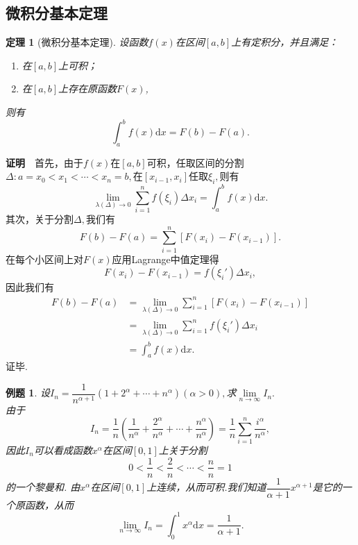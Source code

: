 \documentclass[UTF8]{article}
\newcommand{\dx}{\mathrm{d}x}
\newcommand{\zm}{\textbf{证明}$\quad$}
\newtheorem{thm}{\hspace{2em}定理}[section]
\newtheorem{exa}{\hspace{2em}例题}[section]
\begin{document}
  \subsection{微积分基本定理}
    \begin{thm}[微积分基本定理]
      设函数$f(x)$在区间$[a,b]$上有定积分，并且满足：
      \begin{enumerate}
        \item 在$[a,b]$上可积；
        \item 在$[a,b]$上存在原函数$F(x)$,
      \end{enumerate}
      则有$$\int_a^bf(x)\dx=F(b)-F(a).$$
      \end{thm}
      \zm 首先，由于$f(x)$在$[a,b]$可积，任取区间的分割$\Delta:a=x_0<x_1<\cdots<x_n=b,$在$[x_{i-1},x_i]$任取$\xi_i,$则有
      $$\lim_{\lambda(\Delta)\to0}\sum_{i=1}^nf(\xi_i)\Delta x_i=\int_a^bf(x)\dx.$$
      其次，关于分割$\Delta,$我们有
      $$F(b)-F(a)=\sum_{i=1}^n[F(x_i)-F(x_{i-1})].$$
      在每个小区间上对$F(x)$应用Lagrange中值定理得
      $$F(x_i)-F(x_{i-1})=f(\xi_i')\Delta x_i,$$
      因此我们有
      \begin{align*}
        F(b)-F(a)&=\lim_{\lambda(\Delta)\to0}\sum_{i=1}^n[F(x_i)-F(x_{i-1})]\\
        &=\lim_{\lambda(\Delta)\to0}\sum_{i=1}^nf(\xi_i')\Delta x_i\\
        &=\int_a^bf(x)\dx.
      \end{align*}
      证毕.
    \begin{exa}
      设$I_n=\dfrac{1}{n^{\alpha+1}}(1+2^\alpha+\cdots+n^\alpha)(\alpha>0),$求$\lim\limits_{n\to\infty}I_n.$\\
      由于
      $$I_n=\frac{1}{n}\left(\frac{1}{n^\alpha}+\frac{2^\alpha}{n^\alpha}+\cdots+\frac{n^\alpha}{n^\alpha}\right)
      =\frac{1}{n}\sum_{i=1}^n\frac{i^\alpha}{n^\alpha},$$
      因此$I_n$可以看成函数$x^\alpha$在区间$[0,1]$上关于分割
      $$0<\frac{1}{n}<\frac{2}{n}<\cdots<\frac{n}{n}=1$$的一个黎曼和.
      由$x^\alpha$在区间$[0,1]$上连续，从而可积.我们知道$\dfrac{1}{\alpha+1}x^{\alpha+1}$是它的一个原函数，从而
      $$\lim_{n\to\infty}I_n=\int_0^1x^\alpha\dx=\frac{1}{\alpha+1}.$$
    \end{exa}
\end{document}
